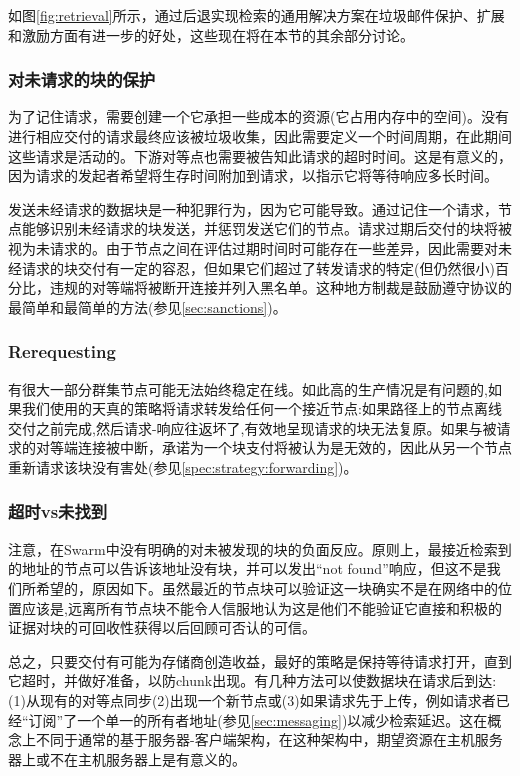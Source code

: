 如图\ref{fig:retrieval}所示，通过后退实现检索的通用解决方案在垃圾邮件保护、扩展和激励方面有进一步的好处，这些现在将在本节的其余部分讨论。

\subsubsection{对未请求的块的保护}

为了记住请求，需要创建一个它承担一些成本的资源(它占用内存中的空间)。没有进行相应交付的请求最终应该被垃圾收集，因此需要定义一个时间周期，在此期间这些请求是活动的。下游对等点也需要被告知此请求的超时时间。这是有意义的，因为请求的发起者希望将生存时间附加到请求，以指示它将等待响应多长时间。

发送未经请求的数据块是一种犯罪行为，因为它可能导致。通过记住一个请求，节点能够识别未经请求的块发送，并惩罚发送它们的节点。请求过期后交付的块将被视为未请求的。由于节点之间在评估过期时间时可能存在一些差异，因此需要对未经请求的块交付有一定的容忍，但如果它们超过了转发请求的特定(但仍然很小)百分比，违规的对等端将被断开连接并列入黑名单。这种地方制裁是鼓励遵守协议的最简单和最简单的方法(参见\ref{sec:sanctions})。 

\subsubsection{Rerequesting}

有很大一部分群集节点可能无法始终稳定在线。如此高的生产情况是有问题的,如果我们使用的天真的策略将请求转发给任何一个接近节点:如果路径上的节点离线交付之前完成,然后请求-响应往返坏了,有效地呈现请求的块无法复原。如果与被请求的对等端连接被中断，承诺为一个块支付将被认为是无效的，因此从另一个节点重新请求该块没有害处(参见\ref{spec:strategy:forwarding})。


\subsubsection{超时vs未找到}

注意，在Swarm中没有明确的对未被发现的块的负面反应。原则上，最接近检索到的地址的节点可以告诉该地址没有块，并可以发出“not found”响应，但这不是我们所希望的，原因如下。虽然最近的节点块可以验证这一块确实不是在网络中的位置应该是,远离所有节点块不能令人信服地认为这是他们不能验证它直接和积极的证据对块的可回收性获得以后回顾可否认的可信。

总之，只要交付有可能为存储商创造收益，最好的策略是保持等待请求打开，直到它超时，并做好准备，以防chunk出现。有几种方法可以使数据块在请求后到达:(1)从现有的对等点同步(2)出现一个新节点或(3)如果请求先于上传，例如请求者已经“订阅”了一个单一的所有者地址(参见\ref{sec:messaging})以减少检索延迟。这在概念上不同于通常的基于服务器-客户端架构，在这种架构中，期望资源在主机服务器上或不在主机服务器上是有意义的。 
 

